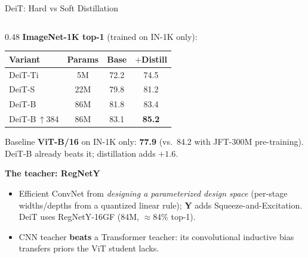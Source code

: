 \begin{frame}{DeiT: Hard vs Soft Distillation}
\begin{columns}
\begin{column}{0.48\textwidth}
      \vspace{0.3em}
      \textbf{ImageNet-1K top-1} (trained on IN-1K only):
      \begin{center}
        \small
        \begin{tabular}{lccc}
          \toprule
          \textbf{Variant} & \textbf{Params} & \textbf{Base} & \textbf{$+$Distill} \\
          \midrule
          DeiT-Ti & 5M  & 72.2 & 74.5 \\
          DeiT-S  & 22M & 79.8 & 81.2 \\
          DeiT-B  & 86M & 81.8 & 83.4 \\
          DeiT-B\,$\uparrow$384 & 86M & 83.1 & \textbf{85.2} \\
          \bottomrule
        \end{tabular}
      \end{center}
      {\footnotesize Baseline \textbf{ViT-B/16} on IN-1K only: \textbf{77.9} (vs.\ 84.2 with JFT-300M pre-training). DeiT-B already beats it; distillation adds $+1.6$. \par}

      \vspace{0.3em}
      \textbf{The teacher: RegNetY} \cite{radosavovic2020regnet}
      {\footnotesize
      \begin{itemize}\itemsep1pt
        \item Efficient ConvNet from \emph{designing a parameterized design space} (per-stage widths/depths from a quantized linear rule); \textbf{Y} adds Squeeze-and-Excitation. DeiT uses RegNetY-16GF (84M, $\approx$84\% top-1).
        \item CNN teacher \textbf{beats} a Transformer teacher: its convolutional inductive bias transfers priors the ViT student lacks.
      \end{itemize}}
    \end{column}
  \end{columns}
\end{frame}

